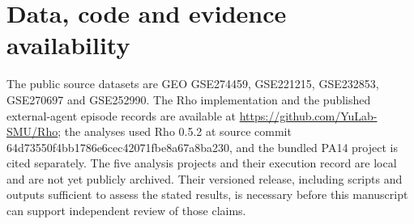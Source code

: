 \documentclass[11pt]{article}
\begin{document}
\section{Data, code and evidence availability}\label{data-code-and-evidence-availability}

The public source datasets are GEO GSE274459, GSE221215, GSE232853, GSE270697 and GSE252990. The Rho implementation and the published external-agent episode records are available at \url{https://github.com/YuLab-SMU/Rho}; the analyses used Rho 0.5.2 at source commit 64d73550f4bb1786e6cec42071fbe8a67a8ba230, and the bundled PA14 project is cited separately. The five analysis projects and their execution record are local and are not yet publicly archived. Their versioned release, including scripts and outputs sufficient to assess the stated results, is necessary before this manuscript can support independent review of those claims.

\FloatBarrier


\end{document}
